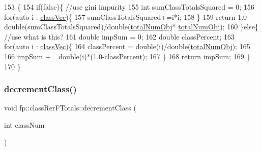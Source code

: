 \begin{DoxyCode}
153                                                  \{
154                 \textcolor{keywordflow}{if}(\textcolor{keyword}{false})\{ \textcolor{comment}{//use gini impurity}
155                     \textcolor{keywordtype}{int} sumClassTotalsSquared = 0;
156                     \textcolor{keywordflow}{for}(\textcolor{keyword}{auto} i : \hyperlink{classfp_1_1classRerFTotals_a4a7b583fc52d7631771f5dd04d20a68a}{classVec})\{
157                         sumClassTotalsSquared+=i*i;
158                     \}
159                     \textcolor{keywordflow}{return} 1.0-double(sumClassTotalsSquared)/double(\hyperlink{classfp_1_1classRerFTotals_a0963284a03586b3a25c284bdb35f9e44}{totalNumObj}*
      \hyperlink{classfp_1_1classRerFTotals_a0963284a03586b3a25c284bdb35f9e44}{totalNumObj});
160                 \}\textcolor{keywordflow}{else}\{ \textcolor{comment}{//use what is this?}
161                     \textcolor{keywordtype}{double} impSum = 0;
162                     \textcolor{keywordtype}{double} classPercent;
163                     \textcolor{keywordflow}{for}(\textcolor{keyword}{auto} i : \hyperlink{classfp_1_1classRerFTotals_a4a7b583fc52d7631771f5dd04d20a68a}{classVec})\{
164                         classPercent = double(i)/double(\hyperlink{classfp_1_1classRerFTotals_a0963284a03586b3a25c284bdb35f9e44}{totalNumObj});
165 
166                         impSum += double(i)*(1.0-classPercent);
167                     \}
168                     \textcolor{keywordflow}{return} impSum;
169                 \}
170             \}
\end{DoxyCode}
\mbox{\label{classfp_1_1classRerFTotals_aac0c0d5bc058592a51d1fceeaf38a8fd}} 
\subsubsection{\texorpdfstring{decrement\+Class()}{decrementClass()}}
{\footnotesize\ttfamily void fp\+::class\+Rer\+F\+Totals\+::decrement\+Class (\begin{DoxyParamCaption}\item[{int}]{class\+Num }\end{DoxyParamCaption})\hspace{0.3cm}{\ttfamily [inline]}}



